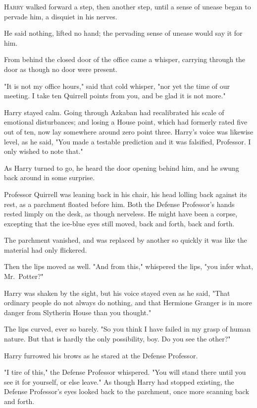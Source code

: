 
\lettrine{H}{arry} walked
forward a step, then another step, until a sense of unease began to pervade
him, a disquiet in his nerves.

He said nothing, lifted no hand; the pervading sense of unease would say it for
him.

From behind the closed door of the office came a whisper, carrying through the
door as though no door were present.

"It is not my office hours," said that cold whisper, "nor yet the time of our
meeting. I take ten Quirrell points from you, and be glad it is not more."

Harry stayed calm. Going through Azkaban had recalibrated his scale of
emotional disturbances; and losing a House point, which had formerly rated five
out of ten, now lay somewhere around zero point three. Harry's voice was
likewise level, as he said, "You made a testable prediction and it was
falsified, Professor. I only wished to note that."

As Harry turned to go, he heard the door opening behind him, and he swung back
around in some surprise.

Professor Quirrell was leaning back in his chair, his head lolling back against
its rest, as a parchment floated before him. Both the Defense Professor's hands
rested limply on the desk, as though nerveless. He might have been a corpse,
excepting that the ice-blue eyes still moved, back and forth, back and forth.

The parchment vanished, and was replaced by another so quickly it was like the
material had only flickered.

Then the lips moved as well. "And from this," whispered the lips, "you infer
what, Mr.~Potter?"

Harry was shaken by the sight, but his voice stayed even as he said, "That
ordinary people do not always do nothing, and that Hermione Granger is in more
danger from Slytherin House than you thought."

The lips curved, ever so barely. "So you think I have failed in my grasp of
human nature. But that is hardly the only possibility, boy. Do you see the
other?"

Harry furrowed his brows as he stared at the Defense Professor.

"I tire of this," the Defense Professor whispered. "You will stand there until
you see it for yourself, or else leave." As though Harry had stopped existing,
the Defense Professor's eyes looked back to the parchment, once more scanning
back and forth.


